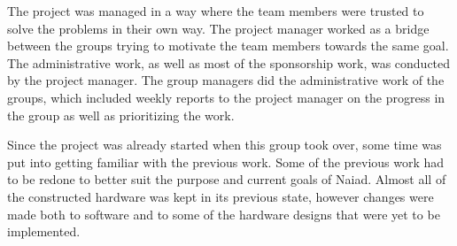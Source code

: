 The project was managed in a way where the team members were trusted to solve the problems in their own way. The project manager worked as a bridge between the groups trying to motivate the team members towards the same goal. The administrative work, as well as most of the sponsorship work, was  conducted by the project manager. The group managers did the administrative work of the groups, which included weekly reports to the project manager on the progress in the group as well as prioritizing the work.

Since the project was already started when this group took over, some time was put into getting familiar with the previous work. Some of the previous work had to be redone to better suit the purpose and current goals of Naiad. Almost all of the constructed hardware was kept in its previous state, however changes were made both to software and to some of the hardware designs that were yet to be implemented.